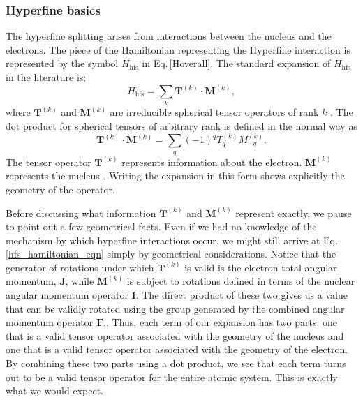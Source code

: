 \subsubsection{Hyperfine basics}

The hyperfine splitting arises from interactions between the nucleus and the electrons. The piece of the Hamiltonian representing the Hyperfine interaction is represented by the symbol $H_{\mathrm{hfs}}$ in Eq.\,\eqref{Hoverall}.
The standard expansion of $H_{\mathrm{hfs}}$ in the literature is:  
\begin{equation}
H_{\mathrm{hfs}}=\sum_k \mathbf{T}^{(k)} \cdot \mathbf{M}^{(k)} \label{hfs_hamiltonian_eqn},
\end{equation}
where $\mathbf{T}^{(k)}$ and $\mathbf{M}^{(k)}$ are irreducible spherical tensor operators of rank $k$
\cite{schwartz_hyperfine_expansion}
\cite{experimental_hyperfine_alkali_arimondo}
\cite{chinesePhysics}.
The dot product for spherical tensors of arbitrary rank is defined in the normal way as
\begin{equation}\label{TkMk_hyperfine}
\mathbf{T}^{(k)}\cdot\mathbf{M}^{(k)}=\sum_q (-1)^qT_q^{(k)}M_{-q}^{(k)}.
\end{equation}
The tensor operator $\mathbf{T}^{(k)}$ represents information about the electron.
$\mathbf{M}^{(k)}$ represents the nucleus\cite{experimental_hyperfine_alkali_arimondo}\cite{schwartz_hyperfine_expansion}
\cite{sobelman_spectra}.
Writing the expansion in this form shows explicitly the geometry of the operator. 

Before discussing what information $\mathbf{T}^{(k)}$ and $\mathbf{M}^{(k)}$ represent exactly,
we pause to point out a few geometrical facts. Even if we had no knowledge of the mechanism by which hyperfine interactions occur, we might still arrive at Eq.\,\ref{hfs_hamiltonian_eqn} simply by geometrical considerations.
Notice that the generator of rotations under which $\mathbf{T}^{(k)}$ is valid is the electron total angular momentum, $\mathbf{J}$, while $\mathbf{M}^{(k)}$ is subject to rotations defined in terms of the nuclear angular momentum operator $\mathbf{I}$. 
The direct product of these two gives us a value that can be validly rotated using the group generated by the combined angular momentum operator $\mathbf{F}$.\cite{Racah2}\cite{sobelman_spectra}. Thus, each term of our expansion has two parts: one that is a valid tensor operator associated with the geometry of the nucleus and one that is a valid tensor operator associated with the geometry of the electron. By combining these two parts using a dot product, we see that each term turns out to be a valid tensor operator for the entire atomic system. This is exactly what we would expect.

